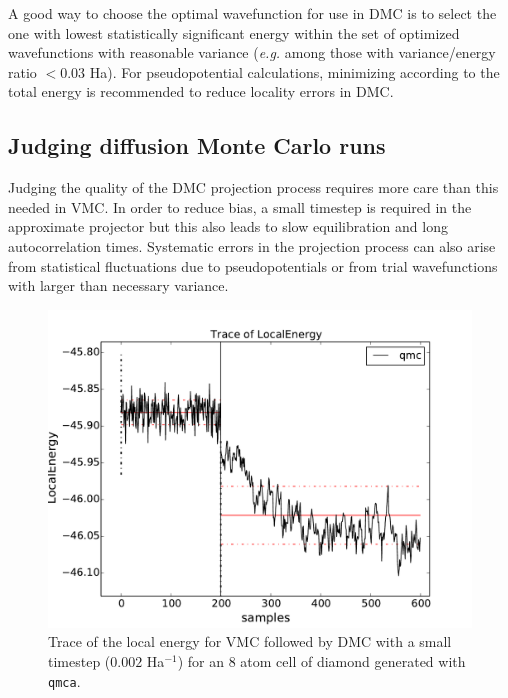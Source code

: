 A good way to choose the optimal wavefunction for use in DMC is to select 
the one with lowest statistically significant energy within the set of 
optimized wavefunctions with reasonable variance (\emph{e.g.} among 
those with variance/energy ratio $<0.03$ Ha).  For pseudopotential 
calculations, minimizing according to the total energy is recommended 
to reduce locality errors in DMC.


\subsection{Judging diffusion Monte Carlo runs}
\label{sec:qmca_judge_dmc}
Judging the quality of the DMC projection process requires more 
care than this needed in VMC.  In order to reduce bias, a small 
timestep is required in the approximate projector but this also 
leads to slow equilibration and long autocorrelation times.  
Systematic errors in the projection process can also arise from 
statistical fluctuations due to pseudopotentials or from trial 
wavefunctions with larger than necessary variance.

\begin{figure}
\begin{center}
\includegraphics[trim = 0mm 0mm 0mm 0mm, clip,width=0.75\columnwidth]{figures/qmca_short_dmc.pdf}
\end{center}
\caption{Trace of the local energy for VMC followed by DMC with a small timestep ($0.002$ Ha$^{-1}$) for an 8 atom cell of diamond generated with \texttt{qmca}.  
\label{fig:qmca_short_dmc}
}
\end{figure}

